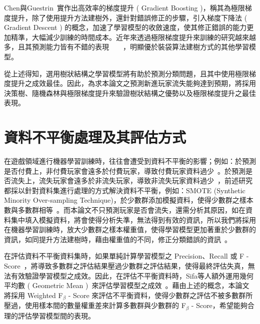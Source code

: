 Chen與Guestrin~\cite{chen2016xgboost}實作出高效率的梯度提升 ( Gradient Boosting )，稱其為極限梯度提升，除了使用提升方法建樹外，還針對錯誤修正的步驟，引入梯度下降法 ( Gradient Descent ) 的概念，加速了學習模型的收斂速度，使其修正錯誤的能力更加精準，大幅減少訓練的時間成本。近年來透過極限梯度提升來訓練的研究越來越多，且其預測能力皆有不錯的表現~\cite{XGBoostTemporalData}~\cite{martinez2020machine}~\cite{semenov2016performance}~\cite{janusz2017helping}，明顯優於裝袋算法建樹方式的其他學習模型。
\newpage

從上述得知，選用樹狀結構之學習模型將有助於預測分類問題，且其中使用極限梯度提升之成效最佳。因此，為求本論文之預測新進玩家流失能夠達到預期，將採用決策樹、隨機森林與極限梯度提升來驗證樹狀結構之優勢以及極限梯度提升之最佳表現。

\section{資料不平衡處理及其評估方式}

在遊戲領域進行機器學習訓練時，往往會遭受到資料不平衡的影響；例如：於預測是否付費上，非付費玩家會遠多於付費玩家，導致付費玩家資料過少~\cite{sifa2015predicting}。於預測是否流失上，流失玩家會遠多於非流失玩家，導致非流失玩家資料過少~\cite{lee2016predicting}，前述研究都採以針對資料集進行處理的方式解決資料不平衡，例如：SMOTE (Synthetic Minority Over-sampling Technique)，於少數群添加模擬資料，使得少數群之樣本數與多數群相等~\cite{chawla2002smote}。而本論文不只預測玩家是否會流失，還需分析其原因，如在資料集中填入模擬資料，將會使得分析失準，無法得到有效的資訊，所以我們將採用在機器學習訓練時，放大少數群之樣本權重值，使得學習模型更加著重於少數群的資訊，如同提升方法建樹時，藉由權重值的不同，修正分類錯誤的資訊~\cite{freund1999short}。

在評估資料不平衡資料集時，如果單純計算學習模型之 Precision、Recall 或 F - Score~\cite{chinchor1993muc}，將導致多數群之評估結果壓過少數群之評估結果，使得最終評估失真，無法有效驗證學習模型之成效。因此，在評估不平衡資料時，Sifa等人額外運用幾何平均數 ( Geometric Mean )~\cite{kubat1997learning}來評估學習模型之成效~\cite{sifa2015predicting}。藉由上述的概念，本論文將採用 Weighted F$_{\beta}$ - Score 來評估不平衡資料，使得少數群之評估不被多數群所壓過，使用樣本間的數量權重差來計算多數群與少數群的 F$_{\beta}$ - Score，希望能夠合理的評估學習模型間的表現。